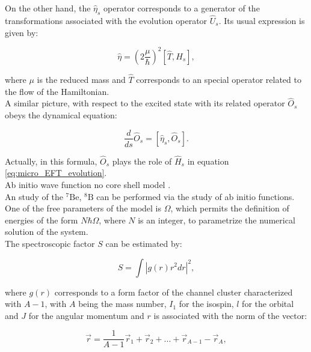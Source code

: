 \documentclass[openany]{book}
\begin{document}
On the other hand, the $\hat \eta_s$ operator corresponds to a generator of the transformations associated with the evolution operator  $\hat U_s$. Its usual expression is given by:
 
  \begin{equation}\label{eq:micro_EFT_hamiltonian_generator}
 	\hat \eta = \left(2 \frac{\mu }{\hbar}\right)^2 [\hat T, \hat H_s],
 \end{equation}

where $\mu$ is the reduced mass and $\hat T$ corresponds to an special operator related to the flow of the Hamiltonian.\\

A similar picture, with respect to the excited state with its related operator $\hat O_s$ obeys the dynamical equation: 

\begin{equation}\label{eq:micro_EFT_evolution_excited}
	\frac{d}{ds}\hat O_s = [\hat \eta_s, \hat O_s].
\end{equation}

Actually, in this formula, $\hat O_s$ plays the role of $\hat H_s$ in equation \ref{eq:micro_EFT_evolution}.\\
 
Ab initio wave function no core shell model \cite{navratil_bertulani_caurier_2006}. \\

An study of the $\mathrm{{}^{7}Be}$,  $\mathrm{{}^{8}B}$ can be performed via the study of ab initio functions. One of the free parameters of the model is $\Omega$, which permits the definition of energies of the form $N\hbar \Omega$, where $N$ is an integer, to parametrize the numerical solution of the system. \\

The spectroscopic factor $S$ can be estimated by: 

\begin{equation}\label{eq:micro_NCSH_application_S}
	S = \int { \left| g (r)  r^2 dr \right|^2},
\end{equation}

where $g(r)$ corresponds to a form factor of the channel cluster characterized with $A - 1$, with $A$ being the mass number, $I_1$ for the isospin, $l$ for the orbital and $J$ for the angular momentum and $r$ is associated with the norm of the vector: 

\begin{equation}\label{eq:micro_NCSH_application_r}
	\vec r  = \frac{1} {A - 1} \vec r_1 + \vec r_2 + ... + \vec r_{A-1} - \vec r_A,
\end{equation}
\end{document}
